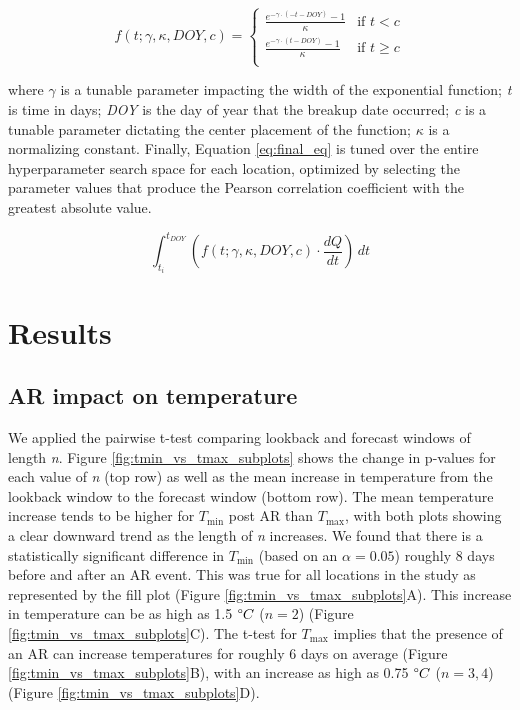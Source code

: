 \documentclass[12pts,draft]{AR_analysis_}
\begin{document}
\begin{equation}
	\label{eq:cases}
	f(t; \gamma, \kappa, DOY, c) =
	\begin{cases}
    	\frac{e^{-\gamma \cdot (-t - DOY)} - 1}{\kappa} & \text{if }
        	t < c \\
    	\frac{e^{-\gamma \cdot (t - DOY)} - 1}{\kappa} & \text{if }
        	t \geq c \\
	\end{cases}
\end{equation}

\noindent where $\gamma$ is a tunable parameter impacting the width of
the exponential function; \emph{t} is time in days; 
\emph{DOY} is the day of year
that the breakup date occurred; \emph{c} is a tunable parameter dictating the
center placement of the function; $\kappa$ is a normalizing constant.
Finally, Equation \ref{eq:final_eq} is tuned over the entire 
hyperparameter search space for each
location, optimized by selecting the parameter values that produce 
the Pearson correlation 
coefficient with the greatest absolute value. 

\begin{equation}
\label{eq:final_eq}
	\int_{t_i}^{t_{DOY}} \left(f(t; \gamma, \kappa, DOY, c) \cdot
	\frac{dQ}{dt}\right) \, dt
\end{equation}



\section{Results} 

\subsection{AR impact on temperature}

We applied the pairwise t-test comparing lookback and forecast 
windows of length \emph{n}. Figure
\ref{fig:tmin_vs_tmax_subplots} shows the change in p-values for each
value of \emph{n} (top row) as well as the mean increase in temperature
from the lookback window to the forecast window (bottom row). The mean
temperature increase tends to be higher for $T_{\text{min}}$ post AR than  
$T_{\text{max}}$, with both plots
showing a clear downward trend as the length of \emph{n} 
increases. We found that there is a
statistically significant difference in $T_{\text{min}}$ 
(based on an $\alpha = 0.05$) roughly 8 days before and after 
an AR event. 
This was true for all locations in the study as represented 
by the fill plot (Figure \ref{fig:tmin_vs_tmax_subplots}A). 
This increase in 
temperature can be as high as 1.5 $\degree C$ ($n=2$) (Figure 
\ref{fig:tmin_vs_tmax_subplots}C). The t-test for
 $T_{\text{max}}$ implies that the presence of an AR can increase 
 temperatures for roughly 6 days on average (Figure 
 \ref{fig:tmin_vs_tmax_subplots}B), with an increase as high 
 as 0.75 $\degree C$ ($n={3, 4}$) (Figure 
 \ref{fig:tmin_vs_tmax_subplots}D).    
\end{document}
